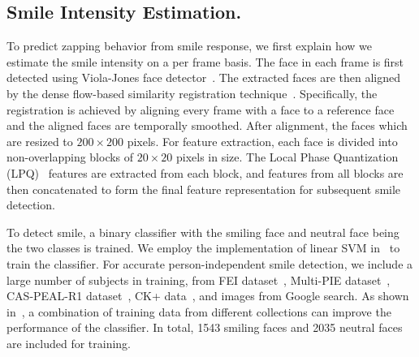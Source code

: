 \documentclass[twoside,leqno,twocolumn]{article}
\begin{document}
\subsection{Smile Intensity Estimation.}

To predict zapping behavior from smile response, we first explain how we estimate the smile intensity on a per frame basis. The face in each frame is first detected using Viola-Jones face detector~\cite{Viola_IJCV04}. The extracted faces are then aligned by the dense flow-based similarity registration technique~\cite{Yang13}. Specifically, the registration is achieved by aligning every frame with a face to a reference face and the aligned faces are temporally smoothed. After alignment, the faces which are resized to $200\times200$ pixels. For feature extraction, each face is divided into non-overlapping blocks of $20\times20$ pixels in size. The Local Phase Quantization (LPQ)~\cite{Ojansivu_ICISP08} features are extracted from each block, and features from all blocks are then concatenated to form the final feature representation for subsequent smile detection.

To detect smile, a binary classifier with the smiling face and neutral face being the two classes is trained. We employ the implementation of linear SVM in~\cite{SVMlib} to train the classifier. For accurate person-independent smile detection, we include a large number of subjects in training, from FEI dataset~\cite{FEI}, Multi-PIE dataset~\cite{MPIE}, CAS-PEAL-R1 dataset~\cite{CAS}, CK+ data~\cite{CKplus}, and images from Google search. As shown in~\cite{Le14}, a combination of training data from different collections can improve the performance of the classifier. In total, 1543 smiling faces and 2035 neutral faces are included for training.
\end{document}

